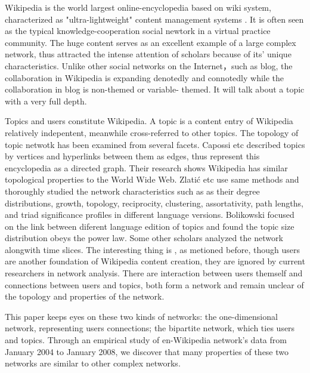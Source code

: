 \documentclass{elsarticle}
\begin{document}

Wikipedia is the world largest online-encyclopedia based on wiki
system,  characterized as "ultra-lightweight" content management systems
\cite{mattison2003qst}. It is often seen as the typical
knowledge-cooperation social newtork in a  virtual
practice community. The huge content serves as an excellent example of
a large complex network\cite{Barabasi2003}, thus attracted the intense attention of scholars
because of its' unique characteristics. Unlike other social networks on the
Internet，such as blog,  the
collaboration in Wikipedia is expanding denotedly and connotedly while the collaboration in blog is non-themed or variable- themed. It will talk about a topic with a very full depth\cite{Sauer2005}.

Topics and users constitute  Wikipedia. A topic is a content entry
of Wikipedia relatively indepentent, meanwhile
cross-referred to other topics. The topology of topic netwotk  has
been examined
 from several facets. Capossi etc described topics by vertices and hyperlinks between them as edges, thus represent
this encyclopedia as a directed graph\cite{capocci-2006}. Their research shows Wikipedia has
similar topological properties  to the World Wide Web. Zlati\'{c} etc use
same methods and thoroughly studied the network characteristics such as as their degree distributions, growth, topology, reciprocity, clustering, assortativity, path lengths, and triad
signiﬁcance proﬁles in different language versions\cite{zlatic:016115}. Bolikowski
focused on  the link between diferent language edition of topics and found
the topic size distribution obeys the power
law\cite{bolikowski-2009}. Some other scholars analyzed
the network alongwith time slices\cite{buriol2006taw}. The interesting thing is
, as metioned before, though users are another foundation of Wikipedia
content creation, they are ignored by current researchers in network
analysis. There are interaction between users themself and connections
between users and topics, both form a network and remain unclear of the topology and
properties of the network.    



 This paper keeps eyes  on these two kinds of networks: the
 one-dimensional network, representing users connections; the
 bipartite network, which ties users and topics. Through an
 empirical study of en-Wikipedia network’s data  from January
 2004 to January 2008, we discover that many properties of these two
 networks are similar to other complex networks. 
\end{document}
